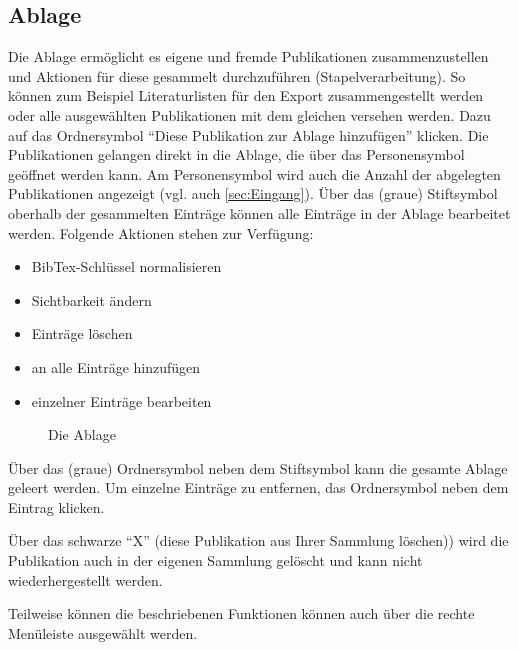 \subsection{Ablage}
\label{sec:ablage}
Die Ablage ermöglicht es eigene und fremde Publikationen zusammenzustellen und Aktionen für diese gesammelt durchzuführen (Stapelverarbeitung). So können zum Beispiel Literaturlisten für den Export zusammengestellt werden oder alle ausgewählten Publikationen mit dem gleichen \tag versehen werden. Dazu auf das Ordnersymbol \enquote{Diese Publikation zur Ablage hinzufügen} klicken. Die Publikationen gelangen direkt in die Ablage, die über das Personensymbol geöffnet werden kann. Am Personensymbol wird auch die Anzahl der abgelegten Publikationen angezeigt (vgl. auch \autoref{sec:Eingang}). 
Über das (graue) Stiftsymbol oberhalb der gesammelten Einträge können alle Einträge in der Ablage bearbeitet werden. Folgende Aktionen stehen zur Verfügung:
\begin{itemize}
\item BibTex-Schlüssel normalisieren
\item Sichtbarkeit ändern
\item Einträge löschen
\item \tags an alle Einträge hinzufügen
\item \tags einzelner Einträge bearbeiten
\end{itemize}
\begin{figure}[h!]
 \centering
 \caption{Die Ablage}
 \label{fig:ablage}
\end{figure} 
Über das (graue) Ordnersymbol neben dem Stiftsymbol kann die gesamte Ablage geleert werden. Um einzelne Einträge zu entfernen, das Ordnersymbol neben dem Eintrag klicken. 
\begin{tip}Über das schwarze \enquote{X} (diese Publikation aus Ihrer Sammlung löschen)) wird die Publikation auch in der eigenen Sammlung gelöscht und kann nicht wiederhergestellt werden.
\end{tip}
Teilweise können die beschriebenen Funktionen können auch über die rechte Menüleiste ausgewählt werden.
